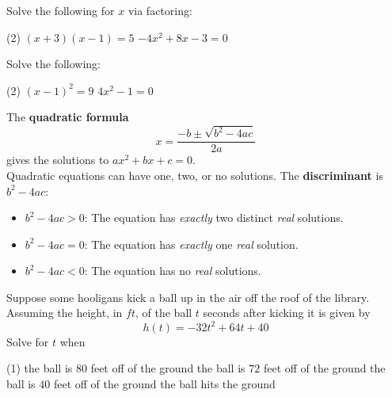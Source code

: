 \documentclass[../mathNotesPreamble]{subfiles}
\begin{document}
    \begin{ex*}
      Solve the following for $x$ via factoring:
    \end{ex*}
    \begin{extasks}[after-item-skip=\stretch{1}](2)
      \task $(x+3)(x-1)=5$
      \task $-4x^2+8x-3=0$
    \end{extasks}
    \pagebreak

    \begin{center}
    \end{center}

    \begin{ex*}
      Solve the following:
    \end{ex*}
    \begin{extasks}[after-item-skip=\stretch{1}](2)
      \task $(x-1)^2=9$
      \task $4x^2-1=0$
    \end{extasks}

    \begin{defn*}
      The \textbf{quadratic formula}
        \[x=\dfrac{-b\pm\sqrt{b^2-4ac}}{2a}\]
      gives the solutions to $ax^2+bx+c=0$.\\[\baselineskip]
      Quadratic equations can have one, two, or no solutions. The \textbf{discriminant} is $b^2-4ac$:
      \begin{itemize}
        \item $b^2-4ac>0$: The equation has \emph{exactly} two distinct \emph{real} solutions.
        \item $b^2-4ac=0$: The equation has \emph{exactly} one \emph{real} solution.
        \item $b^2-4ac<0$: The equation has no \emph{real} solutions.
      \end{itemize}
    \end{defn*}
    \pagebreak

    \begin{ex*}
      Suppose some hooligans kick a ball up in the air off the roof of the library. Assuming the height, in $ft$, of the ball $t$ seconds after kicking it is given by
        \[h(t)=-32t^2+64t+40\]
      Solve for $t$ when
    \end{ex*}
    \begin{extasks}[after-item-skip=\stretch{1}](1)
      \task the ball is $80$ feet off of the ground
      \task the ball is $72$ feet off of the ground
      \task the ball is $40$ feet off of the ground
      \task the ball hits the ground
    \end{extasks}
    \pagebreak
\end{document}
